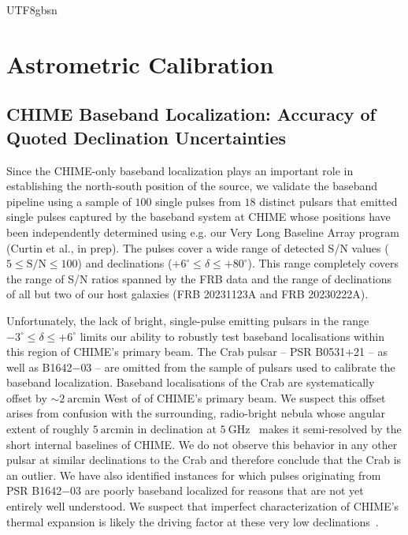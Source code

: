 \documentclass[twocolumn,linenumbers]{aastex631}
\begin{document}
\begin{CJK*}{UTF8}{gbsn}
\section{Astrometric Calibration}\label{sec:accuracy}
\subsection{CHIME Baseband Localization: Accuracy of Quoted Declination Uncertainties}
Since the CHIME-only baseband localization plays an important role in establishing the north-south position of the source, we validate the baseband pipeline using a sample of $100$ single pulses from $18$ distinct pulsars that emitted single pulses captured by the baseband system at CHIME whose positions have been independently determined using e.g. our Very Long Baseline Array program (Curtin et al., in prep). The pulses cover a wide range of detected S/N values ($5 \leq \text{S/N} \leq 100$) and declinations ($+6^\circ \leq \delta \leq +80^\circ$). This range completely covers the range of S/N ratios spanned by the FRB data and the range of declinations of all but two of our host galaxies (FRB 20231123A and FRB 20230222A).

Unfortunately, the lack of bright, single-pulse emitting pulsars in the range $-3^\circ\leq \delta \leq +6^\circ$ limits our ability to robustly test baseband localisations within this region of CHIME's primary beam. The Crab pulsar -- PSR B0531+21 -- as well as B1642$-$03 -- are omitted from the sample of pulsars used to calibrate the baseband localization. Baseband localisations of the Crab are systematically offset by $\sim 2 ~\mathrm{arcmin}$ West of of CHIME's primary beam. We suspect this offset arises from confusion with the surrounding, radio-bright nebula whose angular extent of roughly $5~\mathrm{arcmin}$ in declination at $5~\mathrm{GHz}$~\citep{Bietenholz_2004} makes it semi-resolved by the short internal baselines of CHIME. We do not observe this behavior in any other pulsar at similar declinations to the Crab and therefore conclude that the Crab is an outlier. We have also identified instances for which pulses originating from PSR B1642$-$03 are poorly baseband localized for reasons that are not yet entirely well understood. We suspect that imperfect characterization of CHIME's thermal expansion is likely the driving factor at these very low declinations~\citep{michilli2021analysis}. 


\end{CJK*}
\end{document}
